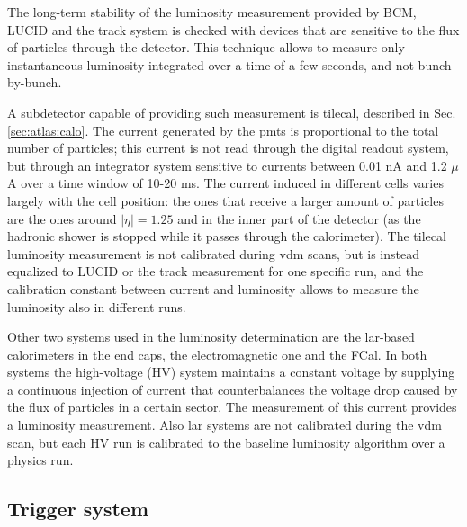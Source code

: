 The long-term stability of the luminosity measurement provided by BCM, LUCID and the track system is checked with devices that are sensitive to the flux of particles through the detector. This technique allows to measure only instantaneous luminosity integrated over a time of a few seconds, and not bunch-by-bunch.

A subdetector capable of providing such measurement is \gls{tilecal}, described in Sec. \ref{sec:atlas:calo}. The current generated by the \glspl{pmt} is proportional to the total number of particles; this current is not read through the digital readout system, but through an integrator system sensitive to currents between 0.01 nA and 1.2 $\mu$A over a time window of 10-20 ms. The current induced in different cells varies largely with the cell position: the ones that receive a larger amount of particles are the ones around $|\eta|=1.25$ and in the inner part of the detector (as the hadronic shower is stopped while it passes through the calorimeter). The \gls{tilecal} luminosity measurement is not calibrated during \gls{vdm} scans, but is instead equalized to LUCID or the track measurement for one specific run, and the calibration constant between current and luminosity allows to measure the luminosity also in different runs.

Other two systems used in the luminosity determination are the \gls{lar}-based calorimeters in the end caps, the electromagnetic one and the FCal. In both systems the high-voltage (HV) system maintains a constant voltage by supplying a continuous injection of current that counterbalances the voltage drop caused by the flux of particles in a certain sector. The measurement of this current provides a luminosity measurement. Also \gls{lar} systems are not calibrated during the \gls{vdm} scan, but each HV run is calibrated to the baseline luminosity algorithm over a physics run.  


\subsection{Trigger system}
\label{sec:cern:trigger}

